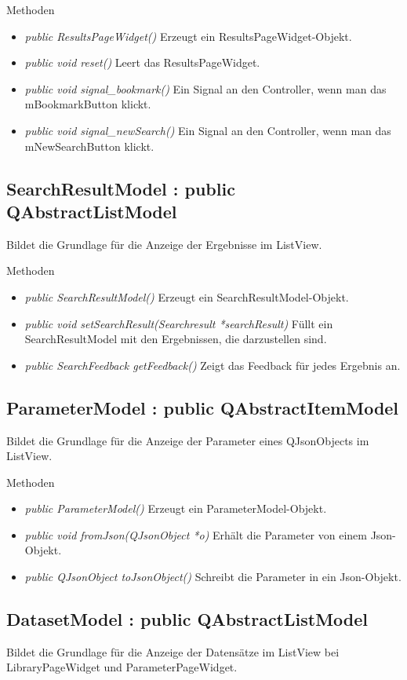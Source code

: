 Methoden
\begin{itemize}
	\item\textit{public ResultsPageWidget()}
	Erzeugt ein ResultsPageWidget-Objekt.
	\item\textit{public void reset()}
	Leert das ResultsPageWidget.
	\item\textit{public void signal\_bookmark()}
	Ein Signal an den Controller, wenn man das mBookmarkButton klickt.
	\item\textit{public void signal\_newSearch()}
	Ein Signal an den Controller, wenn man das mNewSearchButton klickt.
\end{itemize}

\subsection*{SearchResultModel : public QAbstractListModel}
Bildet die Grundlage für die Anzeige der Ergebnisse im ListView.

Methoden
\begin{itemize}
	\item\textit{public SearchResultModel()}
	Erzeugt ein SearchResultModel-Objekt.
	\item\textit{public void setSearchResult(Searchresult *searchResult)}
	Füllt ein SearchResultModel mit den Ergebnissen, die darzustellen sind.
	\item\textit{public SearchFeedback getFeedback()}
	Zeigt das Feedback für jedes Ergebnis an.
\end{itemize}

\subsection*{ParameterModel : public QAbstractItemModel}
Bildet die Grundlage für die Anzeige der Parameter eines QJsonObjects im ListView.

Methoden
\begin{itemize}
	\item\textit{public ParameterModel()}
	Erzeugt ein ParameterModel-Objekt.
	\item\textit{public void fromJson(QJsonObject *o)}
	Erhält die Parameter von einem Json-Objekt.
	\item\textit{public QJsonObject toJsonObject()}
	Schreibt die Parameter in ein Json-Objekt.
\end{itemize}

\subsection*{DatasetModel : public QAbstractListModel}
Bildet die Grundlage für die Anzeige der Datensätze im ListView bei LibraryPageWidget und ParameterPageWidget.

